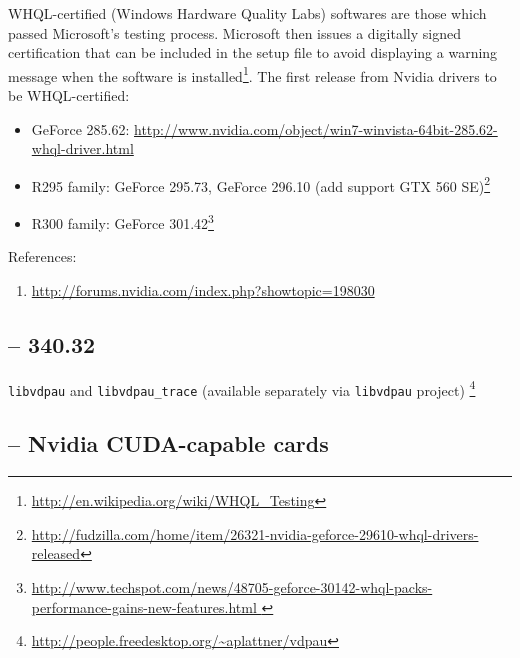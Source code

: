 \begin{framed}
WHQL-certified (Windows Hardware Quality Labs) softwares are those which passed
Microsoft's testing process. Microsoft then issues a digitally signed
certification that can be included in the setup file to avoid
displaying a warning message when the software is
installed\footnote{\url{http://en.wikipedia.org/wiki/WHQL_Testing}}. The first
release from Nvidia drivers to be WHQL-certified:
\begin{itemize}
  \item GeForce 285.62:
  \url{http://www.nvidia.com/object/win7-winvista-64bit-285.62-whql-driver.html}
  \item R295 family: GeForce 295.73, GeForce 296.10 (add support GTX 560
  SE)\footnote{\url{http://fudzilla.com/home/item/26321-nvidia-geforce-29610-whql-drivers-released}}
  \item R300 family: GeForce
  301.42\footnote{\url{http://www.techspot.com/news/48705-geforce-30142-whql-packs-performance-gains-new-features.html
  }}
\end{itemize}
\end{framed}

References:
\begin{enumerate}
  \item \url{http://forums.nvidia.com/index.php?showtopic=198030}
\end{enumerate}


\subsection{-- 340.32}

\verb!libvdpau! and \verb!libvdpau_trace! (available separately via
\verb!libvdpau! project)
\footnote{\url{http://people.freedesktop.org/~aplattner/vdpau}}

\subsection{-- Nvidia CUDA-capable cards}
\label{sec:cuda_gpu}


